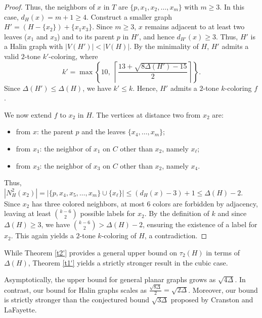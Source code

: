 \documentclass[12pt]{article}
\numberwithin{theorem}{section}
\numberwithin{conjecture}{section}
\numberwithin{corollary}{section}
\numberwithin{example}{section}
\numberwithin{lemma}{section}
\numberwithin{proposition}{section}
\numberwithin{problem}{section}
\numberwithin{remark}{section}
\numberwithin{claim}{theorem}
\numberwithin{definition}{section}
\begin{document}
\begin{proof}
\noindent Thus, the neighbors of $x$ in $T$ are $\{p,x_1,x_2,\dots,x_m\}$ with $m\ge 3$. In this case, $d_H(x)=m+1\ge 4$. Construct a smaller graph $H' = (H - \{x_2\}) + \{x_1x_3\}$. Since $m\ge 3$,  $x$ remains adjacent to at least two leaves ($x_1$ and $x_3$) and to its parent $p$ in $H'$, and hence $d_{H'}(x)\ge 3$. Thus, $H'$ is a Halin graph with $|V(H')|< |V(H)|$. By the minimality of $H$, $H'$ admits a valid $2$-tone $k'$-coloring,
where
\[
k'=\max\left\{
10,\;
\left\lceil \frac{13+\sqrt{8\Delta(H')-15}}{2} \right\rceil
\right\}.
\]
Since $\Delta(H')\le \Delta(H)$, we have $k'\le k$. Hence, $H'$ admits a $2$-tone $k$-coloring $f$.

\noindent We now extend $f$ to $x_2$ in $H$. The vertices at distance two from $x_2$ are:
\begin{itemize}
    \item from $x$: the parent $p$ and the leaves $\{x_4,\dots,x_m\}$;
    \item from $x_1$: the neighbor of $x_1$ on $C$ other than $x_2$, namely $x_\ell$;
    \item from $x_3$: the neighbor of $x_3$ on $C$ other than $x_2$, namely $x_4$.
\end{itemize}
Thus, $|N_H^2(x_2)| = |\{p,x_4,x_5,\dots,x_m\}\cup \{x_\ell\}|\le (d_H(x)-3)+1\le \Delta(H)-2$. Since $x_2$ has three colored neighbors, at most $6$ colors are forbidden by adjacency, leaving at least $\binom{k-6}{2}$ possible labels for $x_2$. By the definition of $k$ and since $\Delta(H)\ge 3$, we have $\binom{k-6}{2}>\Delta(H)-2$, ensuring the existence of a label for $x_2$. This again yields a $2$-tone $k$-coloring of $H$, a contradiction.\end{proof}

\noindent While Theorem \ref{t2'} provides a general upper bound on $\tau_2(H)$ in terms of $\Delta(H)$, Theorem \ref{t1'} yields a strictly stronger result in the cubic case.

\noindent Asymptotically, the upper bound for general planar graphs grows as $\sqrt{4\Delta}$. In contrast, our bound for Halin graphs scales as $\frac{\sqrt{8\Delta}}{2}=\sqrt{2\Delta}$. Moreover, our bound is strictly stronger than the conjectured bound $\sqrt{3\Delta}$ proposed by Cranston and LaFayette.
\end{document}
